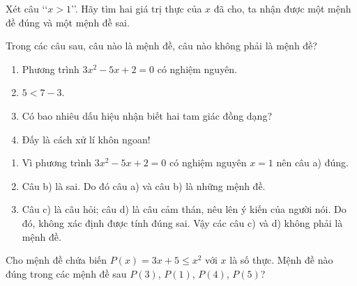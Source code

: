 \begin{bt}%
	Xét câu \lq \lq $x>1$\rq \rq. Hãy tìm hai giá trị thực của $x$ đã cho, ta nhận được một mệnh đề đúng và một mệnh đề sai.
\end{bt}

\begin{bt}%
	Trong các câu sau, câu nào là mệnh đề, câu nào không phải là mệnh đề?
	\begin{enumerate}
		\item Phương trình $3x^2-5x+2=0$ có nghiệm nguyên.
		\item $5<7-3$.
		\item Có bao nhiêu dấu hiệu nhận biết hai tam giác đồng dạng?
		\item Đấy là cách xử lí khôn ngoan!
	\end{enumerate}
	\loigiai
	{\begin{enumerate}
			\item Vì phương trình $3x^2-5x+2=0$ có nghiệm nguyên $x=1$ nên câu a) đúng.\\
			\item Câu b) là sai. Do đó câu a) và câu b) là những mệnh đề.\\
			\item Câu c) là câu hỏi; câu d) là câu cảm thán, nêu lên ý kiến của người nói. Do đó, không xác định được tính đúng sai. Vậy các câu c) và d) không phải là mệnh đề.
	\end{enumerate}}
\end{bt}

\begin{bt}%
	Cho mệnh đề chứa biến $P(x)= 3x+5\le x^2$ với $x$ là số thực. Mệnh đề nào  đúng trong các mệnh đề sau $P(3)$, $P(1)$, $P(4)$, $P(5)$?
\end{bt}

